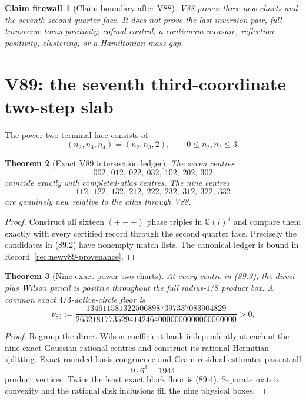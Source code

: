 \documentclass[11pt,oneside]{article}
\newtheorem{theorem}{Theorem}[section]
\newtheorem{firewall}[theorem]{Claim firewall}
\theoremstyle{definition}
\theoremstyle{remark}
\begin{document}
\begin{firewall}[Claim boundary after V88]
\label{fire:newv88-final}
V88 proves three new charts and the seventh second quarter face.  It
does not prove the last inversion pair, full-transverse-torus
positivity, cofinal control, a continuum measure, reflection
positivity, clustering, or a Hamiltonian mass gap.
\end{firewall}

\section{V89: the seventh third-coordinate two-step slab}
\label{sec:newv89-seventh-third-slab}

The power-two terminal face consists of
\[
 (n_2,n_3,n_4)=(n_2,n_3,2),\qquad
 0\leq n_2,n_3\leq3.                                 \tag{89.1}
\]

\begin{theorem}[Exact V89 intersection ledger]
\label{thm:newv89-intersection}
The seven centres
\[
 002,\ 012,\ 022,\ 032,\ 102,\ 202,\ 302             \tag{89.2}
\]
coincide exactly with completed-atlas centres.  The nine centres
\[
 112,\ 122,\ 132,\ 212,\ 222,\ 232,\ 312,\ 322,\ 332 \tag{89.3}
\]
are genuinely new relative to the atlas through V88.
\end{theorem}

\begin{proof}
Construct all sixteen \((+-+)\) phase triples in
\(\mathbb Q(i)^3\) and compare them exactly with every certified
record through the second quarter face.  Precisely the candidates
in (89.2) have nonempty match lists.  The canonical ledger is bound
in Record~\ref{rec:newv89-provenance}.
\end{proof}

\begin{theorem}[Nine exact power-two charts]
\label{thm:newv89-nine-charts}
At every centre in (89.3), the direct plus Wilson pencil is positive
throughout the full radius-\(1/8\) product box.  A common exact
\(4/3\)-active-circle floor is
\[
\nu_{89}:=
\frac{1346115813225068987397337083904829}
     {263218177352941424640000000000000000000}>0.     \tag{89.4}
\]
\end{theorem}

\begin{proof}
Regroup the direct Wilson coefficient bank independently at each of
the nine exact Gaussian-rational centres and construct its rational
Hermitian splitting.  Exact rounded-basis congruence and
Gram-residual estimates pass at all
\[
 9\cdot6^3=1944                                       \tag{89.5}
\]
product vertices.  Twice the least exact block floor is (89.4).
Separate matrix convexity and the rational disk inclusions fill the
nine physical boxes.
\end{proof}
\end{document}
